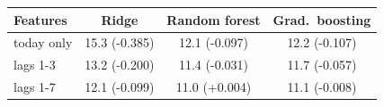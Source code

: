 \begin{tabular}{lccc}
\toprule
Features & Ridge & Random forest & Grad.\ boosting \\
\midrule
today only & 15.3 (-0.385) & 12.1 (-0.097) & 12.2 (-0.107) \\
lags 1-3 & 13.2 (-0.200) & 11.4 (-0.031) & 11.7 (-0.057) \\
lags 1-7 & 12.1 (-0.099) & 11.0 (+0.004) & 11.1 (-0.008) \\
\bottomrule
\end{tabular}
